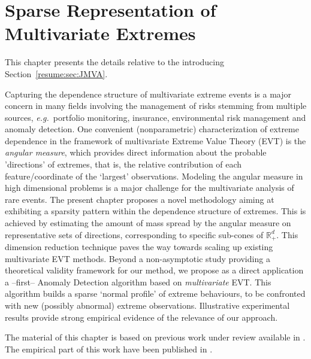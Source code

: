 \chapter{Sparse Representation of Multivariate Extremes}
\label{jmva}


\begin{chapabstract}
This chapter presents the details relative to the introducing Section~\ref{resume:sec:JMVA}.

Capturing the dependence structure of multivariate extreme events is
a major concern in many fields involving the management of risks
stemming from multiple sources, \emph{e.g.}~portfolio monitoring, insurance, environmental risk management and anomaly detection.
One convenient (nonparametric) characterization of  extreme dependence in the
framework of multivariate Extreme Value Theory (EVT) is the \textit{angular
  measure}, which provides direct information about the probable
'directions' of extremes, that is, the relative contribution of each
feature/coordinate of the `largest' observations. Modeling the
angular measure in high dimensional problems is a major challenge for
the multivariate analysis of rare events.
The present chapter proposes a novel methodology aiming at 
exhibiting a sparsity pattern within the dependence structure of extremes. 
This is achieved by estimating the amount of mass spread by the angular measure on
representative sets of directions, corresponding to  specific sub-cones of $\mathbb{R}_+^d$.
This dimension reduction technique  paves the way towards scaling up existing multivariate EVT methods.
Beyond a non-asymptotic study providing a theoretical validity
framework for our method, we propose  as a direct application a --first--
Anomaly Detection algorithm based on \textit{multivariate} EVT.  This algorithm builds a sparse `normal profile' of extreme behaviours, to be confronted with new (possibly abnormal) extreme observations. Illustrative experimental results provide strong empirical evidence of the relevance of our approach.

The material of this chapter is based on previous work under review available in \cite{ARXIV16}. The empirical part of this work have been published in \cite{AISTAT15}.
\end{chapabstract}



